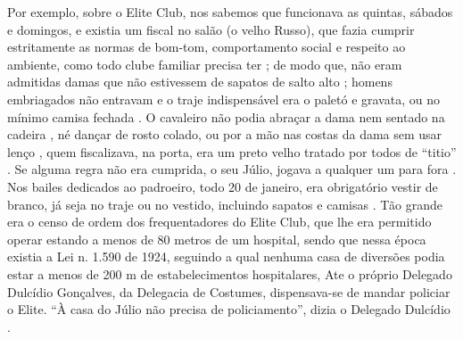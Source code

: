 Por exemplo, sobre o Elite Club,  nos sabemos que funcionava as quintas, sábados e domingos,
e existia um fiscal no salão (o velho Russo)\cite[pp. 37]{gafieirajournalmanchete}, 
que fazia cumprir estritamente as normas de bom-tom, comportamento social e respeito ao ambiente, como todo clube familiar precisa ter \cite[pp. 12]{respeitojournalbrasil1}; de modo que, 
não eram admitidas damas que não estivessem de sapatos de salto alto \cite[pp. 37]{gafieirajournalmanchete};
homens embriagados não entravam e o traje indispensável era o paletó e gravata, 
ou no mínimo camisa fechada \cite[pp. 6 - cad. B]{entrevistajuliojournalbrasil1}.
O cavaleiro não podia abraçar a dama nem sentado na cadeira \cite[pp. 6 - cad. B]{entrevistajuliojournalbrasil1},
né dançar de rosto colado, ou por a mão nas costas da dama sem usar lenço \cite[pp. 10]{simoesjournalbrasil1}, 
quem fiscalizava, na porta, era um preto velho tratado por todos de ``titio''  \cite[pp. 37]{gafieirajournalmanchete}.
Se alguma regra não era cumprida, o seu Júlio, jogava a qualquer um para fora \cite[pp. 6 - cad. B]{entrevistajuliojournalbrasil1}.
Nos bailes dedicados ao padroeiro, todo 20 de janeiro, era obrigatório vestir de branco,
já seja no traje ou no vestido, incluindo sapatos e camisas \cite[pp. 37]{gafieirajournalmanchete}.
Tão grande era o censo de ordem dos frequentadores do Elite Club, 
que lhe era permitido operar estando a menos de 80 metros de um hospital,
sendo que nessa época existia a Lei n. 1.590 de 1924, 
seguindo a qual nenhuma casa de diversões podia estar a menos de 200 m de estabelecimentos hospitalares,
Ate o próprio Delegado Dulcídio Gonçalves, da Delegacia de Costumes,
dispensava-se de mandar policiar o Elite.
``À casa do Júlio não precisa de policiamento'', dizia o Delegado Dulcídio
\cite[pp. 5]{simoesjournalalutademocratica1}.


